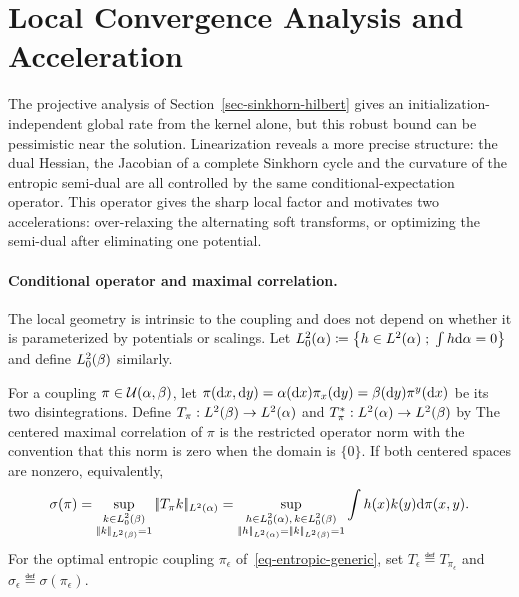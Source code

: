 \section{Local Convergence Analysis and Acceleration}
\label{sec-sinkhorn-local-acceleration}

The projective analysis of Section~\ref{sec-sinkhorn-hilbert} gives an initialization-independent global rate from the kernel alone, but this robust bound can be pessimistic near the solution. Linearization reveals a more precise structure: the dual Hessian, the Jacobian of a complete Sinkhorn cycle and the curvature of the entropic semi-dual are all controlled by the same conditional-expectation operator. This operator gives the sharp local factor and motivates two accelerations: over-relaxing the alternating soft transforms, or optimizing the semi-dual after eliminating one potential.

\paragraph{Conditional operator and maximal correlation.}

The local geometry is intrinsic to the coupling and does not depend on whether it is parameterized by potentials or scalings. Let
\(
	L_0^2(\alpha)\coloneqq\left\{ h\in L^2(\alpha) \;;\; \int h\mathrm{d}\alpha=0 \right\}
\)
and define \(L_0^2(\beta)\) similarly.

\begin{defn}\label{def-sinkhorn-conditional-operator}
	For a coupling $\pi\in\mathcal{U}(\alpha,\beta)$, let
	\(
		\pi(\mathrm{d} x,\mathrm{d} y)=\alpha(\mathrm{d} x)\pi_x(\mathrm{d} y)
		=\beta(\mathrm{d} y)\pi^y(\mathrm{d} x)
	\)
	be its two disintegrations. Define
	\(
		T_\pi:L^2(\beta)\to L^2(\alpha)
	\)
	and
	\(
		T_\pi^*:L^2(\alpha)\to L^2(\beta)
	\)
	by
	The centered maximal correlation of $\pi$ is the restricted operator norm
	with the convention that this norm is zero when the domain is $\{0\}$. If both centered spaces are nonzero, equivalently,
	\[
		\sigma(\pi)
		=
		\sup_{\substack{k\in L_0^2(\be)\\\norm{k}_{L^2(\be)}=1}}
		\norm{T_\pi k}_{L^2(\al)}
		=
		\sup_{\substack{h\in L_0^2(\al),\,k\in L_0^2(\be)\\
		\norm{h}_{L^2(\al)}=\norm{k}_{L^2(\be)}=1}}
		\int h(x)k(y)\d\pi(x,y).
	\]
	For the optimal entropic coupling $\pi_\epsilon$ of~\eqref{eq-entropic-generic}, set
	\(
		T_\epsilon\eqdef T_{\pi_\epsilon}
	\)
	and
	\(
		\sigma_\epsilon\eqdef\sigma(\pi_\epsilon).
	\)
\end{defn}

